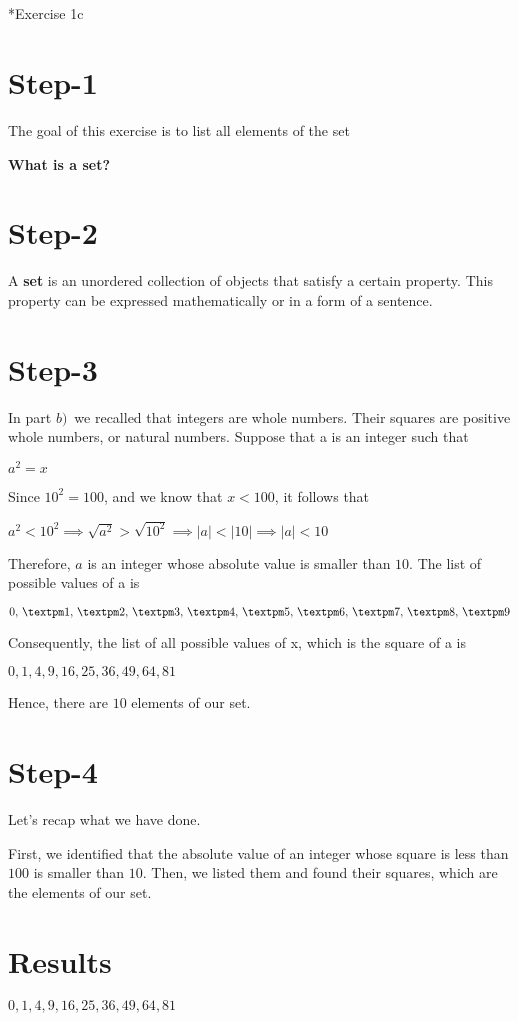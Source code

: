 \documentclass[
  letterpaper,
  DIV=11,
  numbers=noendperiod]{scrreprt}
\makeatletter
\let\oldsubparagraph\subparagraph
\renewcommand{\subparagraph}{
    \@ifstar
      \xxxSubParagraphStar
      \xxxSubParagraphNoStar
  }
\newcommand{\xxxSubParagraphStar}[1]{\oldsubparagraph*{#1}\mbox{}}
\newcommand{\xxxSubParagraphNoStar}[1]{\oldsubparagraph{#1}\mbox{}}
\makeatother
\begin{document}
\begin{tcolorbox}[enhanced jigsaw, colframe=quarto-callout-note-color-frame, toprule=.15mm, bottomrule=.15mm, rightrule=.15mm, colback=white, breakable, arc=.35mm, opacityback=0, left=2mm, leftrule=.75mm]
\subparagraph*{Exercise 1c}\label{exercise-1c}

\section{Step-1}

The goal of this exercise is to list all elements of the set

\textbf{What is a set?}

\section{Step-2}

A \textbf{set} is an unordered collection of objects that satisfy a
certain property. This property can be expressed mathematically or in a
form of a sentence.

\section{Step-3}

In part \(b)\,\) we recalled that integers are whole numbers. Their
squares are positive whole numbers, or natural numbers. Suppose that a
is an integer such that

\(a^2=x\)

Since \(10^2=100\), and we know that \(x<100\), it follows that

\(a^2 < 10^2 ⟹ \sqrt{a^2} > \sqrt{10^2} ⟹ |a| < |10| ⟹ |a| < 10\)

Therefore, \(a\) is an integer whose absolute value is smaller than
\(10\). The list of possible values of a is

\(0,\thinspace±1,\thinspace±2,\thinspace±3,\thinspace±4,\thinspace±5,\thinspace±6,\thinspace±7,\thinspace±8,\thinspace±9\)

Consequently, the list of all possible values of x, which is the square
of a is

\(0,1,4,9,16,25,36,49,64,81\)

Hence, there are \(10\) elements of our set.

\section{Step-4}

Let's recap what we have done.

First, we identified that the absolute value of an integer whose square
is less than \(100\) is smaller than \(10\). Then, we listed them and
found their squares, which are the elements of our set.

\section{Results}

\(0,1,4,9,16,25,36,49,64,81\)

\end{tcolorbox}
\end{document}
